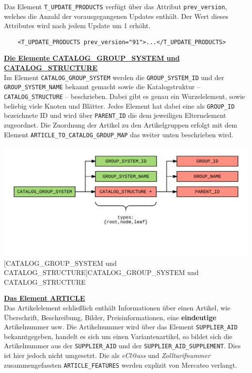 	Das Element \texttt{T\_UPDATE\_PRODUCTS} verfügt über das Attribut \texttt{prev\_version}, welches die Anzahl der vorausgegangenen Updates enthält. Der Wert dieses Attributes wird nach jedem Update um 1 erhöht.
	
	\begin{lstlisting}
	<T_UPDATE_PRODUCTS prev_version="91">...</T_UPDATE_PRODUCTS>
	\end{lstlisting}
	
	
	
	\textbf{\underline{Die Elemente CATALOG\_GROUP\_SYSTEM und CATALOG\_STRUCTURE}}\\
	
	Im Element \texttt{CATALOG\_GROUP\_SYSTEM} werden die \texttt{GROUP\_SYSTEM\_ID} und der \texttt{GROUP\_SYSTEM\_NAME} bekannt gemacht sowie die Katalogstruktur -- \texttt{CATALOG\_STRUCTURE} --  beschrieben. Dabei gibt es genau ein Wurzelelement, sowie beliebig viele Knoten und Blätter. Jedes Element hat dabei eine als \texttt{GROUP\_ID} bezeichnete ID und wird über \texttt{PARENT\_ID} die  dem jeweiligen Elternelement zugeordnet. Die Zuordnung der Artikel zu den Artikelgruppen erfolgt mit dem Element \texttt{ARTICLE\_TO\_CATALOG\_GROUP\_MAP} das weiter unten beschrieben wird.
	
	\begin{minipage}{\linewidth}
		\vspace{1em}
		\centering
		\includegraphics[width=0.85\linewidth]{img/catalogGroupSystem}
		[CATALOG\_GROUP\_SYSTEM und CATALOG\_STRUCTURE]{CATALOG\_GROUP\_SYSTEM und CATALOG\_STRUCTURE}
		\label{fig:header}
		\vspace{1em}
	\end{minipage} 
	
	\textbf{\underline{Das Element ARTICLE}}\\
	Das Artikelelement schließlich enthält Informationen über einen Artikel, wie Überschrift, Beschreibung, Bilder, Preisinformationen, eine \textbf{eindeutige} Artikelnummer usw. Die Artikelnummer wird über das Element \texttt{SUPPLIER\_AID} bekanntgegeben, handelt es sich um einen Variantenartikel, so bildet sich die Artikelnummer aus der \texttt{SUPPLIER\_AID} und der \texttt{SUPPLIER\_AID\_SUPPLEMENT}. Dies ist hier jedoch nicht umgesetzt. Die als \textit{eCl@ass} und \textit{Zolltarifnummer} zusammengefassten \texttt{ARTICLE\_FEATURES} werden explizit von Mercateo verlangt.
	
